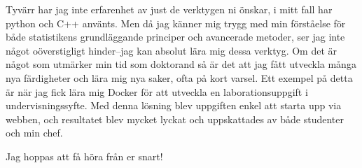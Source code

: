\documentclass[11pt, a4paper]{../awesome-cv} %
\begin{document}
\begin{cvletter}
Tyvärr har jag inte erfarenhet av just de verktygen ni önskar, i mitt fall har python och C++ använts.
Men då jag känner mig trygg med min förståelse för både statistikens grundläggande principer och avancerade metoder, ser jag inte något oöverstigligt hinder–jag kan absolut lära mig dessa verktyg.
Om det är något som utmärker min tid som doktorand så är det att jag fått utveckla många nya färdigheter och lära mig nya saker, ofta på kort varsel.
Ett exempel på detta är när jag fick lära mig Docker för att utveckla en laborationsuppgift i undervisningssyfte. 
Med denna lösning blev uppgiften enkel att starta upp via webben, och resultatet blev mycket lyckat och uppskattades av både studenter och min chef.


Jag hoppas att få höra från er snart!

\end{cvletter}


\makeletterclosing %
\end{document}
